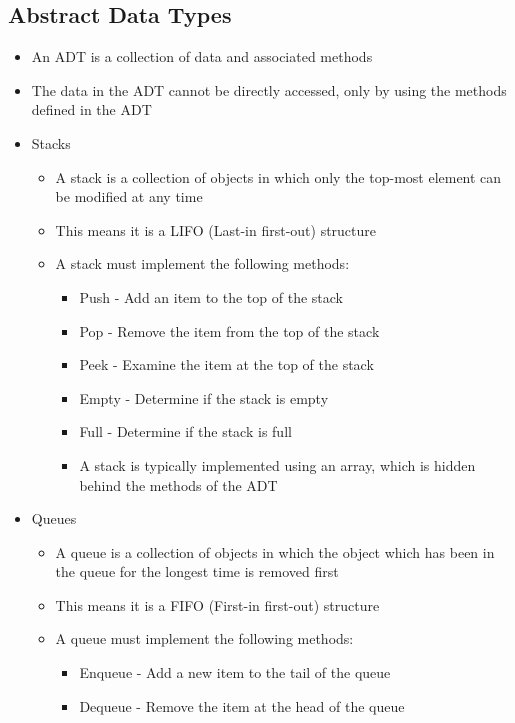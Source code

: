 \subsection*{Abstract Data Types}

\begin{itemize}
  \item An ADT is a collection of data and associated methods
  \item The data in the ADT cannot be directly accessed, only by using the methods defined in the ADT
\end{itemize}

\begin{itemize}
  \item Stacks
  \begin{itemize}
    \item A stack is a collection of objects in which only the top-most element can be modified at any time
    \item This means it is a LIFO (Last-in first-out) structure
    \item A stack must implement the following methods:
    \begin{itemize}
      \item Push - Add an item to the top of the stack
      \item Pop - Remove the item from the top of the stack
      \item Peek - Examine the item at the top of the stack
      \item Empty - Determine if the stack is empty
      \item Full - Determine if the stack is full
      \item A stack is typically implemented using an array, which is hidden behind the methods of the ADT
    \end{itemize}
  \end{itemize}
  \item Queues
  \begin{itemize}
    \item A queue is a collection of objects in which the object which has been in the queue for the longest time is removed first
    \item This means it is a FIFO (First-in first-out) structure
    \item A queue must implement the following methods:
    \begin{itemize}
      \item Enqueue - Add a new item to the tail of the queue
      \item Dequeue - Remove the item at the head of the queue

\end{itemize}
\end{itemize}
\end{itemize}
